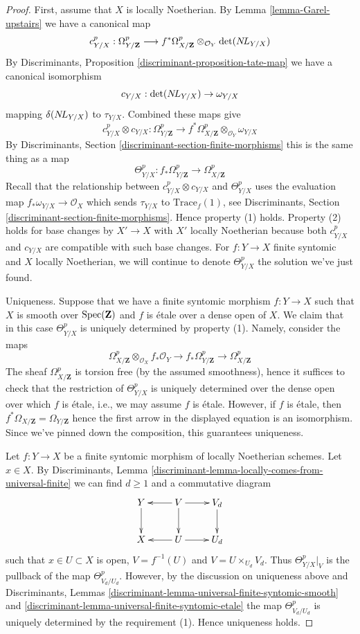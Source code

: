 \begin{proof}
First, assume that $X$ is locally Noetherian. By
Lemma \ref{lemma-Garel-upstairs} we have a canonical map
$$
c^p_{Y/X} : \Omega_{Y/\mathbf{Z}}^p
\longrightarrow
f^*\Omega_{X/\mathbf{Z}}^p \otimes_{\mathcal{O}_Y} \det(\mathop{N\!L}\nolimits_{Y/X})
$$
By Discriminants, Proposition \ref{discriminant-proposition-tate-map}
we have a canonical isomorphism
$$
c_{Y/X} : \det(\mathop{N\!L}\nolimits_{Y/X}) \to \omega_{Y/X}
$$
mapping $\delta(\mathop{N\!L}\nolimits_{Y/X})$ to $\tau_{Y/X}$. Combined these maps give
$$
c^p_{Y/X} \otimes c_{Y/X} :
\Omega_{Y/\mathbf{Z}}^p
\longrightarrow
f^*\Omega_{X/\mathbf{Z}}^p \otimes_{\mathcal{O}_Y} \omega_{Y/X}
$$
By Discriminants, Section \ref{discriminant-section-finite-morphisms}
this is the same thing as a map
$$
\Theta_{Y/X}^p :
f_*\Omega_{Y/\mathbf{Z}}^p
\longrightarrow
\Omega_{X/\mathbf{Z}}^p
$$
Recall that the relationship between $c^p_{Y/X} \otimes c_{Y/X}$
and $\Theta_{Y/X}^p$ uses the evaluation map
$f_*\omega_{Y/X} \to \mathcal{O}_X$
which sends $\tau_{Y/X}$ to $\text{Trace}_f(1)$, see
Discriminants, Section \ref{discriminant-section-finite-morphisms}.
Hence property (1) holds. Property (2) holds for base changes by
$X' \to X$ with $X'$ locally Noetherian because both $c^p_{Y/X}$ and
$c_{Y/X}$ are compatible with such base changes. For $f : Y \to X$
finite syntomic and $X$ locally Noetherian,
we will continue to denote $\Theta^p_{Y/X}$ the solution we've just found.

\medskip\noindent
Uniqueness. Suppose that we have a finite syntomic morphism
$f: Y \to X$ such that $X$ is smooth over $\mathop{\mathrm{Spec}}(\mathbf{Z})$
and $f$ is \'etale over a dense open of $X$. We claim that
in this case $\Theta^p_{Y/X}$ is uniquely determined by property (1).
Namely, consider the maps
$$
\Omega^p_{X/\mathbf{Z}} \otimes_{\mathcal{O}_X} f_*\mathcal{O}_Y \to
f_*\Omega^p_{Y/\mathbf{Z}} \to
\Omega^p_{X/\mathbf{Z}}
$$
The sheaf $\Omega^p_{X/\mathbf{Z}}$ is torsion free (by the assumed
smoothness), hence it suffices to check that the restriction of
$\Theta^p_{Y/X}$ is uniquely determined over the dense open over
which $f$ is \'etale, i.e., we may assume $f$ is \'etale.
However, if $f$ is \'etale, then
$f^*\Omega_{X/\mathbf{Z}} = \Omega_{Y/\mathbf{Z}}$
hence the first arrow in the displayed equation is an isomorphism.
Since we've pinned down the composition, this guarantees uniqueness.

\medskip\noindent
Let $f : Y \to X$ be a finite syntomic morphism of locally Noetherian schemes.
Let $x \in X$. By Discriminants, Lemma
\ref{discriminant-lemma-locally-comes-from-universal-finite}
we can find $d \geq 1$ and a commutative diagram
$$
\xymatrix{
Y \ar[d] &
V \ar[d] \ar[l] \ar[r] &
V_d \ar[d] \\
X &
U \ar[l] \ar[r] &
U_d
}
$$
such that $x \in U \subset X$ is open, $V = f^{-1}(U)$
and $V = U \times_{U_d} V_d$. Thus $\Theta^p_{Y/X}|_V$
is the pullback of the map $\Theta^p_{V_d/U_d}$.
However, by the discussion on uniqueness above and
Discriminants, Lemmas
\ref{discriminant-lemma-universal-finite-syntomic-smooth} and
\ref{discriminant-lemma-universal-finite-syntomic-etale}
the map $\Theta^p_{V_d/U_d}$ is uniquely determined
by the requirement (1). Hence uniqueness holds.


\end{proof}
